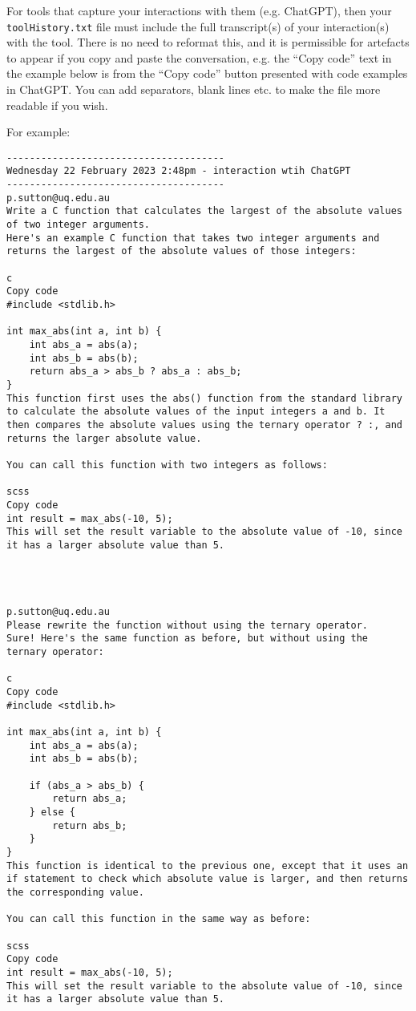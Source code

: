 \documentclass{article}
\begin{document}
For tools that capture your interactions with them (e.g. ChatGPT), then your \texttt{toolHistory.txt} file must include the full transcript(s) 
of your interaction(s) with the tool. There is no need to reformat this, and it is permissible for artefacts to appear if you copy and 
paste the conversation, e.g. the ``Copy code'' text  in the example below is from the ``Copy code'' button presented with code examples
in ChatGPT. You can add separators, blank lines etc. to make the file more readable if you wish.

For example:

\nolinenumbers
{}
\begin{lstlisting}
--------------------------------------
Wednesday 22 February 2023 2:48pm - interaction wtih ChatGPT
--------------------------------------
p.sutton@uq.edu.au
Write a C function that calculates the largest of the absolute values of two integer arguments.
Here's an example C function that takes two integer arguments and returns the largest of the absolute values of those integers:

c
Copy code
#include <stdlib.h>

int max_abs(int a, int b) {
    int abs_a = abs(a);
    int abs_b = abs(b);
    return abs_a > abs_b ? abs_a : abs_b;
}
This function first uses the abs() function from the standard library to calculate the absolute values of the input integers a and b. It then compares the absolute values using the ternary operator ? :, and returns the larger absolute value.

You can call this function with two integers as follows:

scss
Copy code
int result = max_abs(-10, 5);
This will set the result variable to the absolute value of -10, since it has a larger absolute value than 5.




p.sutton@uq.edu.au
Please rewrite the function without using the ternary operator.
Sure! Here's the same function as before, but without using the ternary operator:

c
Copy code
#include <stdlib.h>

int max_abs(int a, int b) {
    int abs_a = abs(a);
    int abs_b = abs(b);
    
    if (abs_a > abs_b) {
        return abs_a;
    } else {
        return abs_b;
    }
}
This function is identical to the previous one, except that it uses an if statement to check which absolute value is larger, and then returns the corresponding value.

You can call this function in the same way as before:

scss
Copy code
int result = max_abs(-10, 5);
This will set the result variable to the absolute value of -10, since it has a larger absolute value than 5.
\end{lstlisting}
\linenumbers
\end{document}

